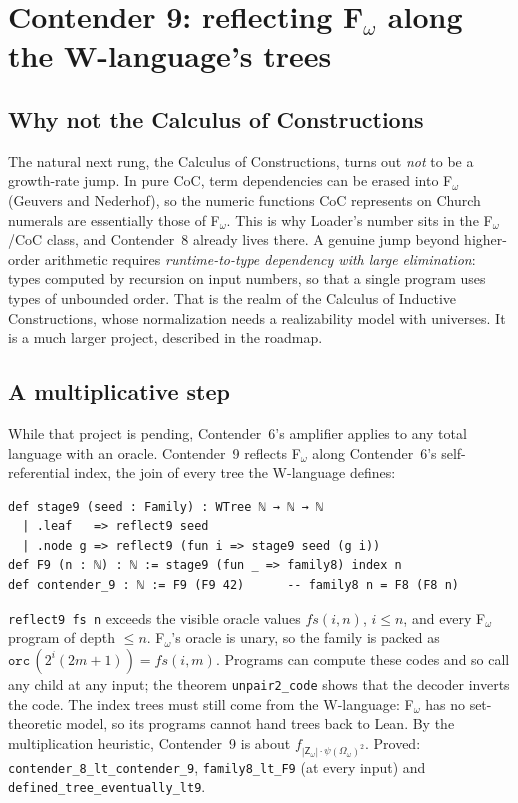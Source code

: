 \documentclass[11pt]{article}
\theoremstyle{definition}
\theoremstyle{remark}
\newcommand{\lean}[1]{\texttt{#1}}
\begin{document}
\section{Contender 9: reflecting \texorpdfstring{F$_\omega$}{F-omega} along the W-language's trees}

\subsection{Why not the Calculus of Constructions}
The natural next rung, the Calculus of Constructions, turns out \emph{not} to
be a growth-rate jump. In pure CoC, term dependencies can be erased into
F$_\omega$ (Geuvers and Nederhof), so the numeric functions CoC represents on
Church numerals are essentially those of F$_\omega$. This is why Loader's number
sits in the F$_\omega$/CoC class, and Contender~8 already lives there. A genuine
jump beyond higher-order arithmetic requires \emph{runtime-to-type dependency
with large elimination}: types computed by recursion on input numbers, so that
a single program uses types of unbounded order. That is the realm of the
Calculus of Inductive Constructions, whose normalization needs a realizability
model with universes. It is a much larger project, described in the roadmap.

\subsection{A multiplicative step}
While that project is pending, Contender~6's amplifier applies to any total
language with an oracle. Contender~9 reflects F$_\omega$ along Contender~6's
self-referential index, the join of every tree the W-language defines:
\begin{lstlisting}
def stage9 (seed : Family) : WTree ℕ → ℕ → ℕ
  | .leaf   => reflect9 seed
  | .node g => reflect9 (fun i => stage9 seed (g i))
def F9 (n : ℕ) : ℕ := stage9 (fun _ => family8) index n
def contender_9 : ℕ := F9 (F9 42)      -- family8 n = F8 (F8 n)
\end{lstlisting}
\lean{reflect9 fs n} exceeds the visible oracle values $fs(i,n)$, $i\le n$, and
every F$_\omega$ program of depth $\le n$. F$_\omega$'s oracle is unary, so the
family is packed as $\mathtt{orc}\,(2^i(2m+1)) = fs(i,m)$. Programs can compute
these codes and so call any child at any input; the theorem
\lean{unpair2\_code} shows that the decoder inverts the code. The index trees
must still come from the W-language: F$_\omega$ has no set-theoretic model, so
its programs cannot hand trees back to Lean. By the multiplication heuristic,
Contender~9 is about $f_{|\mathsf{Z}_\omega|\cdot\psi(\Omega_\omega)^2}$.
Proved: \lean{contender\_8\_lt\_contender\_9}, \lean{family8\_lt\_F9} (at every
input) and \lean{defined\_tree\_eventually\_lt9}.
\end{document}
